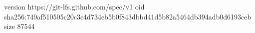 version https://git-lfs.github.com/spec/v1
oid sha256:749af510505c20c3c4d734eb5b0f843dbbd41d5b82a5464db394adb0d6193ceb
size 87544
